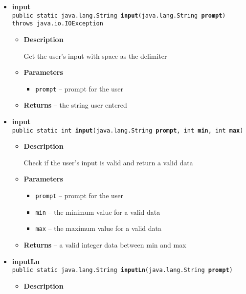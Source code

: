{{{{{{\begin{itemize}
{\begin{itemize}
{Determine if a player complete his/her mission in a certain time
}
\item{
{\bf  Parameters}
  \begin{itemize}
   \item{
\texttt{calendar} -- the calendar of the player/mission}
  \end{itemize}
}%
\item{{\bf  Returns} -- 
true if the player doesn't fail to comply the calendar; false otherwise 
}%
\end{itemize}
}%
\item{ 
{\bf  input}\\
\texttt{public static java.lang.String\ {\bf  input}(\texttt{java.lang.String} {\bf  prompt}) throws java.io.IOException
\label{personOfInterest.Game.input(java.lang.String)}}%
\begin{itemize}
\item{
{\bf  Description}

Get the user's input with space as the delimiter
}
\item{
{\bf  Parameters}
  \begin{itemize}
   \item{
\texttt{prompt} -- prompt for the user}
  \end{itemize}
}%
\item{{\bf  Returns} -- 
the string user entered 
}%
\end{itemize}
}%
\item{ 
{\bf  input}\\
\texttt{public static int\ {\bf  input}(\texttt{java.lang.String} {\bf  prompt},
\texttt{int} {\bf  min},
\texttt{int} {\bf  max})
\label{personOfInterest.Game.input(java.lang.String, int, int)}}%
\begin{itemize}
\item{
{\bf  Description}

Check if the user's input is valid and return a valid data
}
\item{
{\bf  Parameters}
  \begin{itemize}
   \item{
\texttt{prompt} -- prompt for the user}
   \item{
\texttt{min} -- the minimum value for a valid data}
   \item{
\texttt{max} -- the maximum value for a valid data}
  \end{itemize}
}%
\item{{\bf  Returns} -- 
a valid integer data between min and max 
}%
\end{itemize}
}%
\item{ 
{\bf  inputLn}\\
\texttt{public static java.lang.String\ {\bf  inputLn}(\texttt{java.lang.String} {\bf  prompt})
\label{personOfInterest.Game.inputLn(java.lang.String)}}%
\begin{itemize}
\item{
{\bf  Description}

}
\end{itemize}}
\end{itemize}}}}}}}
